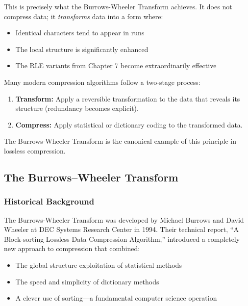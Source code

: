This is precisely what the Burrows-Wheeler Transform achieves. It does not compress data; it \emph{transforms} data into a form where:
\begin{itemize}
    \item Identical characters tend to appear in runs
    \item The local structure is significantly enhanced
    \item The RLE variants from Chapter 7 become extraordinarily effective
\end{itemize}

\begin{definitionbox}
Many modern compression algorithms follow a two-stage process:
\begin{enumerate}
    \item \textbf{Transform:} Apply a reversible transformation to the data that reveals its structure (redundancy becomes explicit).
    \item \textbf{Compress:} Apply statistical or dictionary coding to the transformed data.
\end{enumerate}
The Burrows-Wheeler Transform is the canonical example of this principle in lossless compression.
\end{definitionbox}

\subsection{The Burrows--Wheeler Transform}

\subsubsection{Historical Background}

The Burrows-Wheeler Transform was developed by Michael Burrows and David Wheeler at DEC Systems Research Center in 1994. Their technical report, ``A Block-sorting Lossless Data Compression Algorithm,'' introduced a completely new approach to compression that combined:

\begin{itemize}
    \item The global structure exploitation of statistical methods
    \item The speed and simplicity of dictionary methods
    \item A clever use of sorting—a fundamental computer science operation
\end{itemize}


